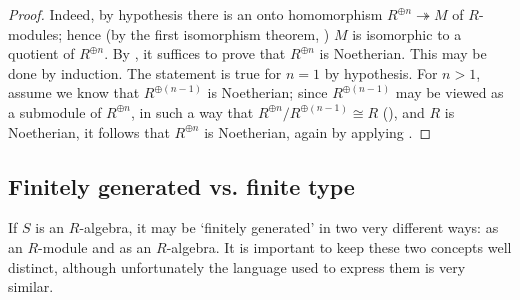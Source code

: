 \begin{proof}
  Indeed, by hypothesis there is an onto homomorphism
  $R^{\oplus n} \twoheadrightarrow M$ of $R$-modules; hence (by the
  first isomorphism theorem, ) $M$
  is isomorphic to a quotient of $R^{\oplus n}$. By
  , it suffices to prove that
  $R^{\oplus n}$ is Noetherian. This may be done by induction. The
  statement is true for $n = 1$ by hypothesis. For $n > 1$, assume we
  know that $R^{\oplus(n-1)}$ is Noetherian; since $R^{\oplus(n-1)}$
  may be viewed as a submodule of $R^{\oplus n}$, in such a way that
  $R^{\oplus n}/R^{\oplus(n-1)} \cong R$
  (), and $R$ is Noetherian, it
  follows that $R^{\oplus n}$ is Noetherian, again by applying
  .
\end{proof}

\subsection{Finitely generated vs. finite type}
\label{subsec:rings:finitely-generated-vs-finite-type}
If $S$ is an $R$-algebra, it may be `finitely generated' in two very
different ways: as an $R$-module and as an $R$-algebra. It is
important to keep these two concepts well distinct, although
unfortunately the language used to express them is very similar.

